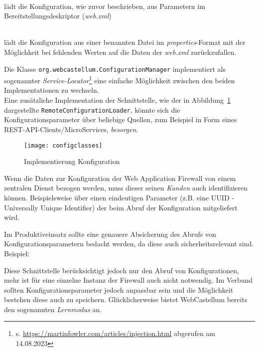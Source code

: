 \begin{description}
  \small
\item[DefaultConfigurationLoader] \hfill \\
  lädt die Konfiguration, wie zuvor beschrieben, aus Parametern im Bereitstellungsdeskriptor (\emph{web.xml})
\item[PropertiesFileConfigurationLoader] \hfill \\
  lädt die Konfiguration aus einer benannten Datei im \emph{properties}-Format mit der Möglichkeit bei fehlenden Werten auf die Daten der \emph{web.xml} zurückzufallen.
\end{description}

Die Klasse \verb=org.webcastellum.ConfigurationManager= implementiert als sogenannter \emph{Service-Locator}\footnote{s. \url{https://martinfowler.com/articles/injection.html} abgerufen am 14.08.2023} eine einfache Möglichkeit zwischen den beiden Implementationen zu wechseln.\\
Eine zusätzliche Implementation der Schnittstelle, wie der in Abbildung~\ref{fig.impkonfig} dargestellte \verb=RemoteConfigurationLoader=, könnte sich die Konfigurationsparameter über beliebige Quellen, zum Beispiel in Form eines REST-API-Clients/MicroServices, \glqq\emph{besorgen}\grqq. 

\begin{figure}[h]
  \begin{center}
    \texttt{[image: configclasses]}
    \caption{Implementierung Konfiguration}
    \label{fig.impkonfig}
  \end{center}
\end{figure}

Wenn die Daten zur Konfiguration der Web Application Firewall von einem zentralen Dienst bezogen werden, muss dieser seinen \emph{Kunden} auch identifizieren können. Beispielsweise über einen eindeutigen Parameter (z.B. eine UUID - Universally Unique Identifier) der beim Abruf der Konfiguration mitgeliefert wird. 


Im Produktiveinsatz sollte eine genauere Absicherung des Abrufs von Konfigurationsparametern bedacht werden, da diese auch sicherheitsrelevant sind.\\

\textcolor{bhtGray}{ Beispiel:} 

Diese Schnittstelle berücksichtigt jedoch nur den Abruf von Konfigurationen, mehr ist für eine einzelne Instanz der Firewall auch nicht notwendig. Im Verbund sollten Konfigurationsparameter jedoch anpassbar sein und die Möglichkeit bestehen diese auch zu speichern. Glücklicherweise bietet WebCastellum bereits den sogenannten \glqq\emph{Lernmodus}\grqq{} an.  



